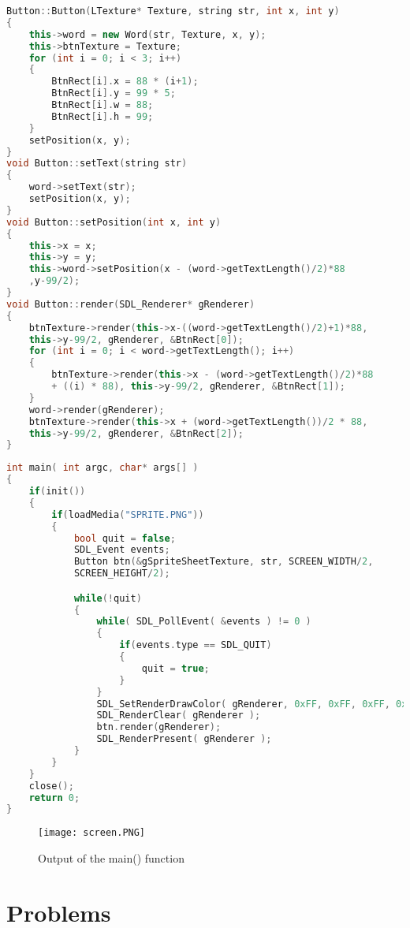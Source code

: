 \documentclass[11pt,fleqn]{book} %
\begin{document}
\begin{lstlisting}[language=C++, caption={Button Methods}]
Button::Button(LTexture* Texture, string str, int x, int y)
{
    this->word = new Word(str, Texture, x, y);
    this->btnTexture = Texture;
    for (int i = 0; i < 3; i++)
    {
        BtnRect[i].x = 88 * (i+1);
        BtnRect[i].y = 99 * 5;
        BtnRect[i].w = 88;
        BtnRect[i].h = 99;
    }
    setPosition(x, y);
}
void Button::setText(string str)
{
	word->setText(str);
	setPosition(x, y);
}
void Button::setPosition(int x, int y)
{
    this->x = x;
    this->y = y;
    this->word->setPosition(x - (word->getTextLength()/2)*88
    ,y-99/2);
}
void Button::render(SDL_Renderer* gRenderer)
{
    btnTexture->render(this->x-((word->getTextLength()/2)+1)*88,
    this->y-99/2, gRenderer, &BtnRect[0]);
    for (int i = 0; i < word->getTextLength(); i++)
    {
        btnTexture->render(this->x - (word->getTextLength()/2)*88
        + ((i) * 88), this->y-99/2, gRenderer, &BtnRect[1]);
    }
    word->render(gRenderer);
    btnTexture->render(this->x + (word->getTextLength())/2 * 88,
    this->y-99/2, gRenderer, &BtnRect[2]);
}
\end{lstlisting}

\begin{lstlisting}[language=C++, caption={main() function}]
int main( int argc, char* args[] )
{
    if(init())
    {
        if(loadMedia("SPRITE.PNG"))
        {
            bool quit = false;
            SDL_Event events;
            Button btn(&gSpriteSheetTexture, str, SCREEN_WIDTH/2,
            SCREEN_HEIGHT/2);

            while(!quit)
            {
                while( SDL_PollEvent( &events ) != 0 )
                {
                    if(events.type == SDL_QUIT)
                    {
                        quit = true;
                    }
                }
				SDL_SetRenderDrawColor( gRenderer, 0xFF, 0xFF, 0xFF, 0xFF );
				SDL_RenderClear( gRenderer );
                btn.render(gRenderer);
				SDL_RenderPresent( gRenderer );
            }
        }
    }
    close();
    return 0;
}
\end{lstlisting}

\begin{figure}[h]
    \centering
    \texttt{[image: screen.PNG]}
    \caption{Output of the main() function}
\end{figure}

\newpage
\section{Problems}
\end{document}

